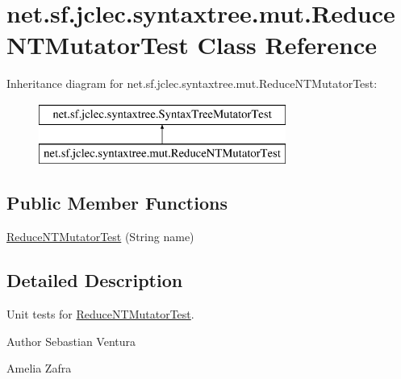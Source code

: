 \hypertarget{classnet_1_1sf_1_1jclec_1_1syntaxtree_1_1mut_1_1_reduce_n_t_mutator_test}{\section{net.\-sf.\-jclec.\-syntaxtree.\-mut.\-Reduce\-N\-T\-Mutator\-Test Class Reference}
\label{classnet_1_1sf_1_1jclec_1_1syntaxtree_1_1mut_1_1_reduce_n_t_mutator_test}
}
Inheritance diagram for net.\-sf.\-jclec.\-syntaxtree.\-mut.\-Reduce\-N\-T\-Mutator\-Test\-:\begin{figure}[H]
\begin{center}
\leavevmode
\includegraphics[height=2.000000cm]{classnet_1_1sf_1_1jclec_1_1syntaxtree_1_1mut_1_1_reduce_n_t_mutator_test}
\end{center}
\end{figure}
\subsection*{Public Member Functions}
\begin{DoxyCompactItemize}
\item 
\hyperlink{classnet_1_1sf_1_1jclec_1_1syntaxtree_1_1mut_1_1_reduce_n_t_mutator_test_a03ddbce1bebba1eafff47e3a321d94f8}{Reduce\-N\-T\-Mutator\-Test} (String name)
\end{DoxyCompactItemize}


\subsection{Detailed Description}
Unit tests for \hyperlink{classnet_1_1sf_1_1jclec_1_1syntaxtree_1_1mut_1_1_reduce_n_t_mutator_test}{Reduce\-N\-T\-Mutator\-Test}.

\begin{DoxyAuthor}{Author}
Sebastian Ventura 

Amelia Zafra 
\end{DoxyAuthor}


